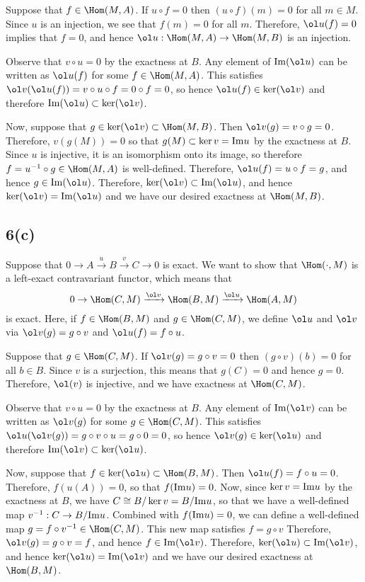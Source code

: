 \documentclass[12pt, reqno]{amsart}
\begin{document}
Suppose that $f \in \Hom(M, A)$. If $u \circ f = 0$ then 
$(u \circ f)(m) = 0$ for all $m \in M$. Since $u$ is an injection, we see that
$f(m) = 0$ for all $m$. Therefore, $\ol u (f) = 0$ implies that $f = 0$, and
hence $\ol u:\Hom(M, A) \to \Hom(M, B)$ is an injection.

Observe that $v \circ u = 0$ by the exactness at $B$. 
Any element of $\im(\ol u)$ can be written as $\ol u(f)$ for some
$f \in \Hom(M, A)$. This satisfies 
$\ol v (\ol u (f)) = v \circ u \circ f = 0 \circ f = 0$, so hence
$\ol u(f) \in \ker (\ol v)$ and therefore $\im(\ol u) \subset \ker (\ol v)$.

Now, suppose that $g \in \ker(\ol v) \subset \Hom(M, B)$. Then 
$\ol v(g) = v \circ g = 0$. Therefore, 
$v(g(M)) = 0$ so that $g(M) \subset \ker v = \mathrm{Im} u$ by the exactness at $B$.
Since $u$ is injective, it is an isomorphism onto its image, so therefore 
$f = u^{-1} \circ g \in \Hom(M, A)$ is well-defined.
Therefore, $\ol u(f) = u \circ f = g$, and hence $g \in \im (\ol u)$.
Therefore, $\ker(\ol v) \subset \im (\ol u)$, and hence
$\ker (\ol v) = \im(\ol u)$ and we have our desired exactness at $\Hom(M, B)$.


\subsection*{6(c)}

Suppose that $0 \to A \xrightarrow u B \xrightarrow v C \to 0$ is exact.
We want to show that $\Hom(\cdot, M)$ is a left-exact contravariant functor, 
which means that 
$$
0 \to \Hom(C, M) \xrightarrow{\ol v} \Hom(B, M) \xrightarrow{\ol u} \Hom(A, M)
$$ 
is exact. Here, if $f \in \Hom(B,M)$ and $g \in \Hom(C, M)$, we define 
$\ol u$ and $\ol v$ via $\ol v(g) = g \circ v$ and 
$\ol u(f) = f \circ u$.

Suppose that $g \in \Hom(C, M)$. If $\ol v(g) = g \circ v = 0$ then 
$(g \circ v)(b) = 0$ for all $b \in B$. Since $v$ is a surjection, this means
that $g(C) = 0$ and hence $g = 0$. Therefore, $\ol(v)$ is injective, and we
have exactness at $\Hom(C, M)$.

Observe that $v \circ u = 0$ by the exactness at $B$. 
Any element of $\im(\ol v)$ can be written as $\ol v(g)$ for some
$g \in \Hom(C, M)$. This satisfies 
$\ol u (\ol v (g)) = g \circ v \circ u = g \circ 0 = 0$, so hence
$\ol v(g) \in \ker (\ol u)$ and therefore $\im(\ol v) \subset \ker (\ol u)$.

Now, suppose that $f \in \ker(\ol u) \subset \Hom(B, M)$. Then 
$\ol u(f) = f \circ u = 0$. Therefore, 
$f(u(A)) = 0$, so that $f(\mathrm{Im} u) = 0$. Now, since $\ker v = \mathrm{Im} u$ by the
exactness at $B$, we have  
$C \cong B / \ker v = B / \mathrm{Im} u$, so that we have a well-defined map
$v^{-1} : C \to B / \mathrm{Im} u$.
Combined with $f (\mathrm{Im} u) = 0$, we can define a well-defined map 
$g = f \circ v^{-1} \in \Hom(C, M)$. This new map satisfies $f = g \circ v$
Therefore, $\ol v(g) = g \circ v = f$, and hence $f \in \im (\ol v)$.
Therefore, $\ker(\ol u) \subset \im (\ol v)$, and hence
$\ker (\ol u) = \im(\ol v)$ and we have our desired exactness at $\Hom(B, M)$.
\end{document}
